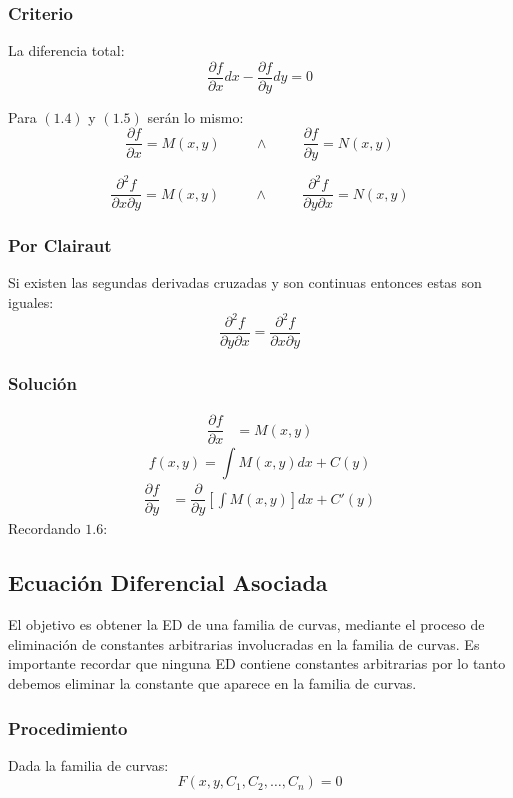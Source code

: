 \subsubsection{Criterio}
La diferencia total:
\begin{equation}
\dfrac{\partial f}{\partial x}dx - \dfrac{\partial f}{\partial y}dy=0
\end{equation}

Para $(1\texttt{.}4)$ y $(1\texttt{.} 5)$ serán lo mismo:
\begin{equation}
\dfrac{\partial f}{\partial x}=M(x,y) \hspace{1cm} \wedge \hspace{1cm} \dfrac{\partial f}{\partial y}=N(x,y)
\end{equation}

$$\dfrac{\partial^2 f}{\partial x \partial y}=M(x,y) \hspace{1cm} \wedge \hspace{1cm} \dfrac{\partial^2 f}{\partial y\partial x}=N(x,y)$$
\subsubsection{Por Clairaut}
Si existen las segundas derivadas cruzadas y son continuas entonces estas son iguales:
$$\dfrac{\partial^2 f}{\partial y\partial x}=\dfrac{\partial^2 f}{\partial x\partial y}$$
\subsubsection{Solución}
\begin{align*}
\dfrac{\partial f}{\partial x} & = M(x,y)
\end{align*}
\begin{equation}
f(x,y)= \int M(x,y) dx + C(y)
\end{equation}
\begin{align*}
\dfrac{\partial f}{\partial y} & = \dfrac{\partial}{\partial y}\left[\int M(x,y)\right]  dx + C'(y) 
\end{align*}
Recordando $1\texttt{.}6$:
\subsection{Ecuación Diferencial Asociada}
El objetivo es obtener la ED de una familia de curvas, mediante el proceso de eliminación de constantes arbitrarias involucradas en la familia de curvas. Es importante recordar que ninguna ED contiene constantes arbitrarias por lo tanto debemos eliminar la constante que aparece en la familia de curvas.
\subsubsection{Procedimiento}
Dada la familia de curvas:
$$F(x,y,C_1,C_2,\ldots,C_n)=0$$
